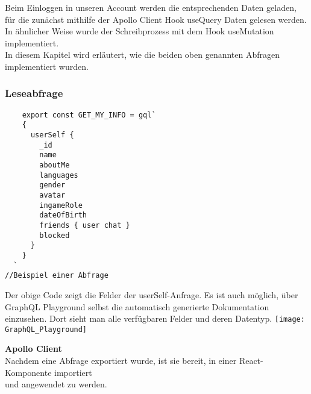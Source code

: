 Beim Einloggen in unseren Account werden die entsprechenden Daten geladen, für die zunächst mithilfe der Apollo Client Hook useQuery Daten gelesen werden.
In ähnlicher Weise wurde der Schreibprozess mit dem Hook useMutation implementiert.
\\
In diesem Kapitel wird erläutert, wie die beiden oben genannten Abfragen implementiert wurden.


\subsubsection{Leseabfrage}
\begin{lstlisting}
    export const GET_MY_INFO = gql`
    {
      userSelf {
        _id
        name
        aboutMe
        languages
        gender
        avatar
        ingameRole
        dateOfBirth
        friends { user chat }        
        blocked
      }
    }
  `
//Beispiel einer Abfrage
\end{lstlisting}
Der obige Code zeigt die Felder der userSelf-Anfrage.
Es ist auch möglich, über GraphQL Playground selbst die automatisch generierte Dokumentation einzusehen.
Dort sieht man alle verfügbaren Felder und deren Datentyp.
\texttt{[image: GraphQL\_Playground]}

\newpage
\textbf{Apollo Client}\\
Nachdem eine Abfrage exportiert wurde, ist sie bereit, in einer React-Komponente importiert \\
und angewendet zu werden.

